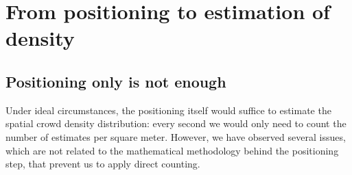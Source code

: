 \documentclass[10pt,a4paper]{article}
\begin{document}
\section{From positioning to estimation of density}
\label{sec:density}


\subsection{Positioning only is not enough}

Under ideal circumstances, the positioning itself would suffice to estimate the spatial crowd density distribution:  every second we would only need to count the number of estimates per square meter. However, we have observed several issues, which are not related to the mathematical methodology behind the positioning step, that prevent us to apply direct counting. 
\end{document}
